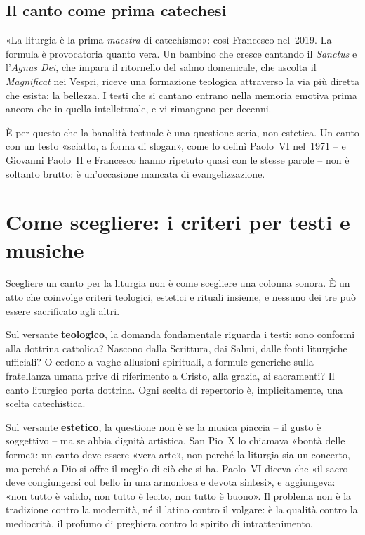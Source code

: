 \documentclass[12pt,a4paper]{article}
\begin{document}
	\subsection{Il canto come prima catechesi}
	
	«La liturgia è la prima \emph{maestra} di catechismo»: così Francesco nel~2019.
	La formula è provocatoria quanto vera. Un bambino che cresce cantando il
	\emph{Sanctus} e l'\emph{Agnus Dei}, che impara il ritornello del salmo
	domenicale, che ascolta il \emph{Magnificat} nei Vespri, riceve una formazione
	teologica attraverso la via più diretta che esista: la bellezza. I testi che si
	cantano entrano nella memoria emotiva prima ancora che in quella intellettuale, e
	vi rimangono per decenni.
	
	È per questo che la banalità testuale è una questione seria, non estetica.
	Un canto con un testo «sciatto, a forma di slogan», come lo definì Paolo~VI
	nel~1971 -- e Giovanni Paolo~II e Francesco hanno ripetuto quasi con le stesse
	parole -- non è soltanto brutto: è un'occasione mancata di evangelizzazione.
	
	\section{Come scegliere: i criteri per testi e musiche}
	
	Scegliere un canto per la liturgia non è come scegliere una colonna sonora. È
	un atto che coinvolge criteri teologici, estetici e rituali insieme, e nessuno
	dei tre può essere sacrificato agli altri.
	
	Sul versante \textbf{teologico}, la domanda fondamentale riguarda i testi: sono
	conformi alla dottrina cattolica? Nascono dalla Scrittura, dai Salmi, dalle fonti
	liturgiche ufficiali? O cedono a vaghe allusioni spirituali, a formule generiche
	sulla fratellanza umana prive di riferimento a Cristo, alla grazia, ai
	sacramenti? Il canto liturgico porta dottrina. Ogni scelta di repertorio è,
	implicitamente, una scelta catechistica.
	
	Sul versante \textbf{estetico}, la questione non è se la musica piaccia -- il
	gusto è soggettivo -- ma se abbia dignità artistica. San Pio~X lo chiamava
	«bontà delle forme»: un canto deve essere «vera arte», non perché la liturgia
	sia un concerto, ma perché a Dio si offre il meglio di ciò che si ha. Paolo~VI
	diceva che «il sacro deve congiungersi col bello in una armoniosa e devota
	sintesi», e aggiungeva: «non tutto è valido, non tutto è lecito, non tutto è
	buono». Il problema non è la tradizione contro la modernità, né il latino contro
	il volgare: è la qualità contro la mediocrità, il profumo di preghiera contro lo
	spirito di intrattenimento.
	
\end{document}

